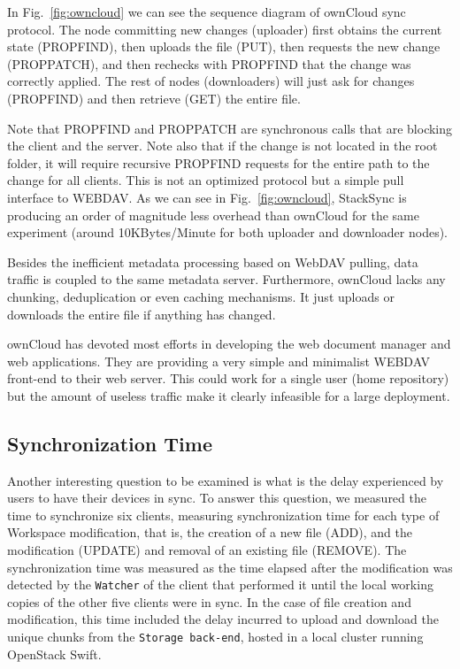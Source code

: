 In Fig.~\ref{fig:owncloud} we can see the sequence diagram of ownCloud sync protocol. The node committing new changes (uploader) first obtains the current state (PROPFIND), then uploads the file (PUT), then requests the new change (PROPPATCH), and then rechecks with PROPFIND that the change was correctly applied. The rest of nodes (downloaders) will just ask for changes (PROPFIND) and then retrieve (GET) the entire file. 


Note that PROPFIND and PROPPATCH are synchronous calls that are blocking the client and the server. Note also that if the change is not located in the root folder, it will require recursive PROPFIND requests for the entire path to the change for all clients.  This is not an optimized protocol but a simple pull interface to WEBDAV. As we can see in Fig.~\ref{fig:owncloud},  StackSync is producing an order of magnitude less overhead  than ownCloud for the same experiment  (around 10KBytes/Minute for both uploader and downloader nodes). 


Besides the inefficient metadata processing based on WebDAV pulling, data traffic is coupled to the same metadata server. Furthermore, ownCloud lacks any chunking, deduplication or even caching mechanisms. It just uploads or downloads the entire file if anything has changed.

ownCloud has devoted most efforts in developing the web document manager and web applications. They are providing a very simple and minimalist WEBDAV front-end  to their web server. This could work for a single user (home repository) but the amount of useless traffic make it clearly infeasible for a large deployment.

\subsection{Synchronization Time}

Another interesting question to be examined is what is the delay experienced by users to have their devices in sync. 
To answer this question, we measured the time to synchronize six clients, measuring synchronization time for each type
of Workspace modification, that is, the creation of a new file (ADD), and the modification (UPDATE) and removal
of an existing file (REMOVE). The synchronization time was measured as the time elapsed after the modification
was detected by the \texttt{Watcher} of the client that performed it until the local working copies of the other
five clients were in sync. In the case of file creation and modification, this time included the delay incurred
to upload and download the unique chunks from the \texttt{Storage back-end}, hosted in a local cluster running OpenStack Swift. 

